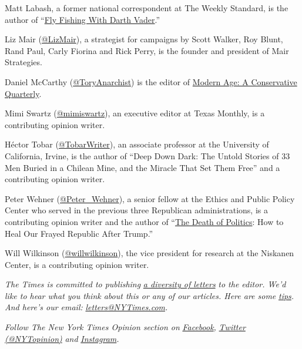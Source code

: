 Matt Labash, a former national correspondent at The Weekly Standard, is
the author of
``\href{https://www.simonandschuster.com/books/Fly-Fishing-with-Darth-Vader/Matt-Labash/9781439159989}{Fly
Fishing With Darth Vader}.''

Liz Mair (\href{https://twitter.com/LizMair}{@LizMair}), a strategist
for campaigns by Scott Walker, Roy Blunt, Rand Paul, Carly Fiorina and
Rick Perry, is the founder and president of Mair Strategies.

Daniel McCarthy
(\href{https://twitter.com/ToryAnarchist}{@ToryAnarchist}) is the editor
of \href{https://home.isi.org/modern-age}{Modern Age: A Conservative
Quarterly}.

Mimi Swartz (\href{https://twitter.com/mimiswartz}{@mimiswartz}), an
executive editor at Texas Monthly, is a contributing opinion writer.

Héctor Tobar
(\href{https://twitter.com/TobarWriter?ref_src=twsrc\%5Egoogle\%7Ctwcamp\%5Eserp\%7Ctwgr\%5Eauthor}{@TobarWriter}),
an associate professor at the University of California, Irvine, is the
author of ``Deep Down Dark: The Untold Stories of 33 Men Buried in a
Chilean Mine, and the Miracle That Set Them Free'' and a contributing
opinion writer.

Peter Wehner
(\href{https://twitter.com/Peter_Wehner?ref_src=twsrc\%5Egoogle\%7Ctwcamp\%5Eserp\%7Ctwgr\%5Eauthor}{@Peter\_Wehner}),
a senior fellow at the Ethics and Public Policy Center who served in the
previous three Republican administrations, is a contributing opinion
writer and the author of
``\href{https://www.harpercollins.com/9780062820792/the-death-of-politics/}{The
Death of Politics}: How to Heal Our Frayed Republic After Trump.''

Will Wilkinson
(\href{https://twitter.com/willwilkinson}{@willwilkinson}), the vice
president for research at the Niskanen Center, is a contributing opinion
writer.

\emph{The Times is committed to publishing}
\href{https://www.nytimes3xbfgragh.onion/2019/01/31/opinion/letters/letters-to-editor-new-york-times-women.html}{\emph{a
diversity of letters}} \emph{to the editor. We'd like to hear what you
think about this or any of our articles. Here are some}
\href{https://help.nytimes3xbfgragh.onion/hc/en-us/articles/115014925288-How-to-submit-a-letter-to-the-editor}{\emph{tips}}\emph{.
And here's our email:}
\href{mailto:letters@NYTimes.com}{\emph{letters@NYTimes.com}}\emph{.}

\emph{Follow The New York Times Opinion section on}
\href{https://www.facebookcorewwwi.onion/nytopinion}{\emph{Facebook}}\emph{,}
\href{http://twitter.com/NYTOpinion}{\emph{Twitter (@NYTopinion)}}
\emph{and}
\href{https://www.instagram.com/nytopinion/}{\emph{Instagram}}\emph{.}

